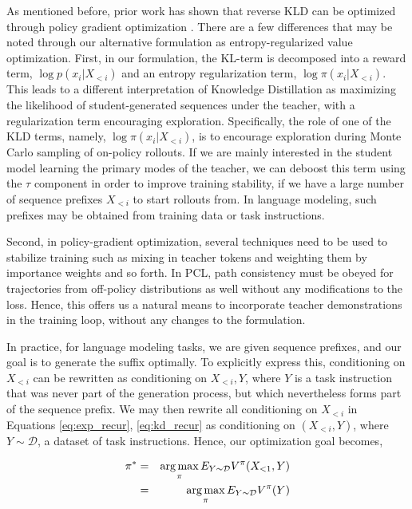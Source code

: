 As mentioned before, prior work has shown that reverse KLD can be optimized through policy gradient optimization \cite{gu2023minillm}. There are a few differences that may be noted through our alternative formulation as entropy-regularized value optimization. First, in our formulation, the KL-term is decomposed into a reward term, $\log p(x_i|X_{<i})$ and an entropy regularization term, $\log \pi(x_i|X_{<i})$. This leads to a different interpretation of Knowledge Distillation as maximizing the likelihood of student-generated sequences under the teacher, with a regularization term encouraging exploration. Specifically, the role of one of the KLD terms, namely, $\log \pi(x_i|X_{<i})$, is to encourage exploration during Monte Carlo sampling of on-policy rollouts. If we are mainly interested in the student model learning the primary modes of the teacher, we can deboost this term using the $\tau$ component in order to improve training stability, if we have a large number of sequence prefixes $X_{<i}$ to start rollouts from. In language modeling, such prefixes may be obtained from training data or task instructions.

Second, in policy-gradient optimization, several techniques need to be used to stabilize training such as mixing in teacher tokens and weighting them by importance weights and so forth. In PCL, path consistency must be obeyed for trajectories from off-policy distributions as well without any modifications to the loss. Hence, this offers us a natural means to incorporate teacher demonstrations in the training loop, without any changes to the formulation.

In practice, for language modeling tasks, we are given sequence prefixes, and our goal is to generate the suffix optimally. To explicitly express this, conditioning on $X_{<i}$ can be rewritten as conditioning on $X_{<i},Y$, where $Y$ is a task instruction that was never part of the generation process, but which nevertheless forms part of the sequence prefix. We may then rewrite all conditioning on $X_{<i}$ in Equations \ref{eq:exp_recur}, \ref{eq:kd_recur} as conditioning on $(X_{<i},Y)$, where $Y \sim \mathcal{D}$, a dataset of task instructions. Hence, our optimization goal becomes,

\begin{eqnarray*}
    \pi^* &=& \operatorname*{arg\,max}_{\pi} E_{Y \sim \mathcal{D}} V^{\pi}(X_{<1}, Y) \\
    &=& \operatorname*{arg\,max}_{\pi} E_{Y \sim \mathcal{D}} V^{\pi}(Y)
\end{eqnarray*}

